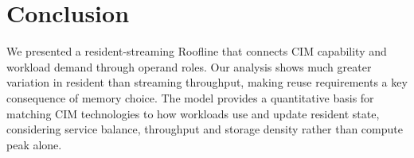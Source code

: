 \section{Conclusion}
We presented a resident-streaming Roofline that connects CIM capability and workload demand through operand roles. Our analysis shows much greater variation in resident than streaming throughput, making reuse requirements a key consequence of memory choice. The model provides a quantitative basis for matching CIM technologies to how workloads use and update resident state, considering service balance, throughput and storage density rather than compute peak alone.
